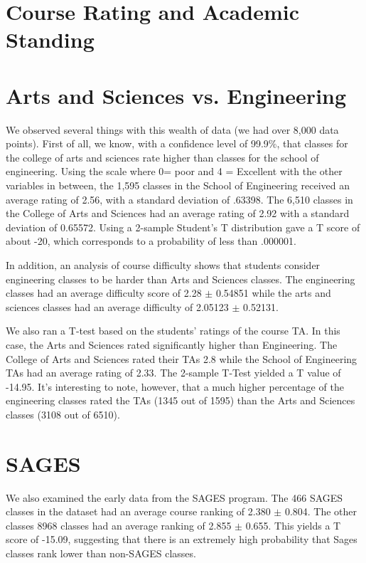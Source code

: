 \documentclass[12pt]{article}
\begin{document}
\section{Course Rating and Academic Standing}

\section{Arts and Sciences vs. Engineering}
We observed several things with this wealth of data (we had over 8,000 data points). First of all, we know, with a confidence level of 99.9\%, that classes for the college of arts and sciences rate higher than classes for the school of engineering. Using the scale where 0= poor and 4 = Excellent with the other variables in between, the 1,595 classes in the School of Engineering received an average rating of 2.56, with a standard deviation of .63398. The 6,510 classes in the College of Arts and Sciences had an average rating of 2.92 with a standard deviation of 0.65572. Using a 2-sample Student's T distribution gave a T score of about -20, which corresponds to a probability of less than .000001.

In addition, an analysis of course difficulty shows that students consider engineering classes to be harder than Arts and Sciences classes. The engineering classes had an average difficulty score of 2.28 $\pm$ 0.54851 while the arts and sciences classes had an average difficulty of 2.05123 $\pm$ 0.52131.

We also ran a T-test based on the students' ratings of the course TA. In this case, the Arts and Sciences rated significantly higher than Engineering. The College of Arts and Sciences rated their TAs 2.8 while the School of Engineering TAs had an average rating of 2.33. The 2-sample T-Test yielded a T value of -14.95. It's interesting to note, however, that a much higher percentage of the engineering classes rated the TAs (1345 out of 1595) than the Arts and Sciences classes (3108 out of 6510).

\section{SAGES}
We also examined the early data from the SAGES program. The 466 SAGES classes in the dataset had an average course ranking of 2.380 $\pm$ 0.804. The other classes 8968 classes had an average ranking of 2.855 $\pm$ 0.655. This yields a T score of -15.09, suggesting that there is an extremely high probability that Sages classes rank lower than non-SAGES classes.
\end{document}
